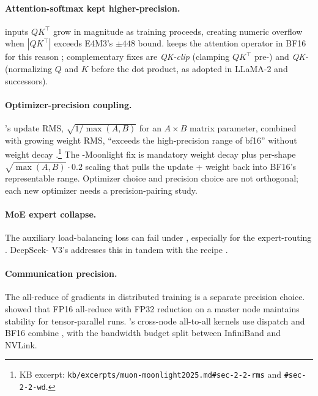 \paragraph{Attention-softmax kept higher-precision.}  inputs
$QK^\top$ grow in magnitude as training proceeds, creating numeric
overflow when $|QK^\top|$ exceeds E4M3's $\pm 448$ bound. 
keeps the attention operator in BF16 for this reason \citep[\S
3.3.1]{deepseek-v3}; complementary fixes are \emph{QK-clip} (clamping
$QK^\top$ pre-) and \emph{QK-} (normalizing $Q$ and
$K$ before the dot product, as adopted in LLaMA-2 and successors).

\paragraph{Optimizer-precision coupling.} 's update RMS,
$\sqrt{1/\max(A, B)}$ for an $A\times B$ matrix parameter, combined
with growing weight RMS, ``exceeds the high-precision range of
bf16'' without weight decay \citep[\S 2.2]{muon-moonlight2025}.\footnote{KB
excerpt: \nolinkurl{kb/excerpts/muon-moonlight2025.md#sec-2-2-rms} and
\texttt{\#sec-2-2-wd}.} The -Moonlight fix is mandatory weight
decay plus per-shape $\sqrt{\max(A, B)} \cdot 0.2$ scaling that pulls
the update + weight back into BF16's representable range. Optimizer
choice and precision choice are not orthogonal; each new optimizer
needs a precision-pairing study.

\paragraph{MoE expert collapse.} The auxiliary load-balancing loss can
fail under , especially for the expert-routing . DeepSeek-
V3's  addresses this in tandem with
the  recipe \citep[abstract]{deepseek-v3}.

\paragraph{Communication precision.} The all-reduce of gradients in
distributed training is a separate precision choice.
\citet{shoeybi2019-megatron} showed that FP16 all-reduce with FP32
reduction on a master node maintains stability for tensor-parallel
runs. 's cross-node all-to-all kernels use  dispatch and
BF16 combine \citep[\S 3.2.2]{deepseek-v3}, with the bandwidth budget
split between InfiniBand and NVLink.

